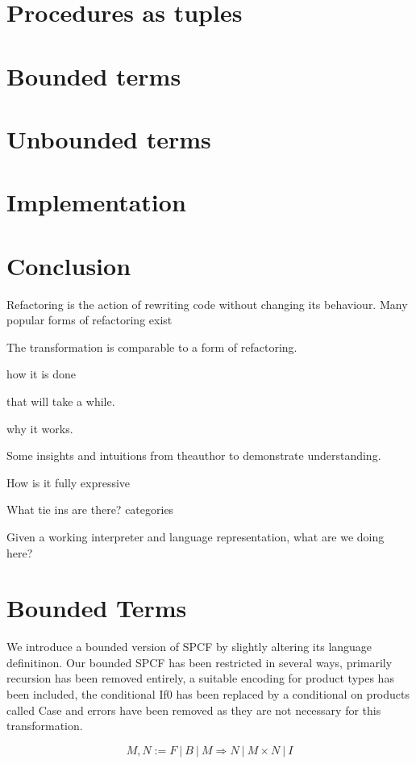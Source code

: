 \documentclass[12pt,a4paper]{report}
\theoremstyle{definition}
\theoremstyle{remark}
\begin{document}
\section{Procedures as tuples}


\section{Bounded terms}
\section{Unbounded terms}
\section{Implementation}
\section{Conclusion}


Refactoring is the action of rewriting code without changing its behaviour. Many popular forms of refactoring exist 

The transformation is comparable to a form of refactoring. 

how it is done 

that will take a while.

why it works.

Some insights and intuitions from theauthor to demonstrate understanding.

How is it fully expressive

What tie ins are there? categories

Given a working interpreter
and language representation, what are we doing here?

\section{Bounded Terms}
We introduce a bounded version of SPCF by slightly altering its language definitinon. Our bounded SPCF has been restricted in several ways, primarily recursion has been removed entirely, a suitable encoding for product types has been included, the conditional If0 has been replaced by a conditional on products called Case and errors have been removed as they are not necessary for this transformation.

\begin{equation}
    M,N := F\ |\ B\ |\ M \Rightarrow N\ |\ M \times N\ |\ I 
\end{equation}
\end{document}
